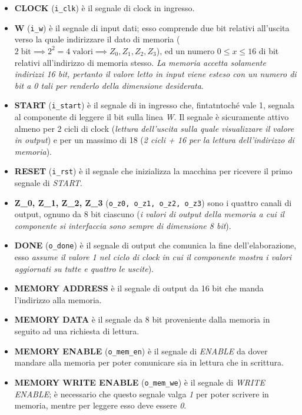 \begin{itemize}
\tightlist
\item
  \textbf{CLOCK} (\texttt{i\_clk}) è il segnale di clock in ingresso.
\item
  \textbf{W} (\texttt{i\_w}) è il segnale di input dati; esso comprende
  due bit relativi all'uscita verso la quale indirizzare il dato di
  memoria
  (\(2\;\text{bit}\implies2^2=4\;\text{valori}\implies Z_0,Z_1,Z_2,Z_3\)),
  ed un numero \(0\leq x\leq 16\) di bit relativi all'indirizzo di
  memoria stesso. \emph{La memoria accetta solamente indirizzi 16 bit,
  pertanto il valore letto in input viene esteso con un numero di bit a
  0 tali per renderlo della dimensione desiderata}.
\item
  \textbf{START} (\texttt{i\_start}) è il segnale di in ingresso che,
  fintatntoché vale 1, segnala al componente di leggere il bit sulla
  linea \emph{W}. Il segnale è sicuramente attivo almeno per 2 cicli di
  clock (\emph{lettura dell'uscita sulla quale visualizzare il valore in
  output}) e per un massimo di 18 (\emph{2 cicli + 16 per la lettura
  dell'indirizzo di memoria}).
\item
  \textbf{RESET} (\texttt{i\_rst}) è il segnale che inizializza la
  macchina per ricevere il primo segnale di \emph{START}.
\item
  \textbf{Z\_0, Z\_1, Z\_2, Z\_3}
  (\texttt{o\_z0,\ o\_z1,\ o\_z2,\ o\_z3}) sono i quattro canali di
  output, ognuno da 8 bit ciascuno (\emph{i valori di output della
  memoria a cui il componente si interfaccia sono sempre di dimensione 8
  bit}).
\item
  \textbf{DONE} (\texttt{o\_done}) è il segnale di output che comunica
  la fine dell'elaborazione, esso \emph{assume il valore 1 nel ciclo di
  clock in cui il componente mostra i valori aggiornati su tutte e
  quattro le uscite}).
\item
  \textbf{MEMORY ADDRESS} è il segnale di output da 16 bit che manda
  l'indirizzo alla memoria.
\item
  \textbf{MEMORY DATA} è il segnale da 8 bit proveniente dalla memoria
  in seguito ad una richiesta di lettura.
\end{itemize}

\pagebreak

\begin{itemize}
\tightlist
\item
  \textbf{MEMORY ENABLE} (\texttt{o\_mem\_en}) è il segnale di
  \emph{ENABLE} da dover mandare alla memoria per poter comunicare sia
  in lettura che in scrittura.
\item
  \textbf{MEMORY WRITE ENABLE} (\texttt{o\_mem\_we}) è il segnale di
  \emph{WRITE ENABLE}; è necessario che questo segnale valga \emph{1}
  per poter scrivere in memoria, mentre per leggere esso deve essere
  \emph{0}.
\end{itemize}

